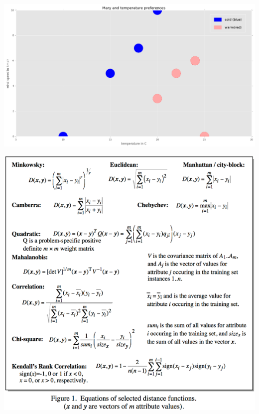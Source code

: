 \documentclass{beamer}
\begin{document}
\begin{frame}\vspace{10pt}
\includegraphics[width=\textwidth]{mary1.png}
\end{frame}

\begin{frame}
    \includegraphics[scale=0.65]{metrics.png}
\end{frame}
\end{document}
